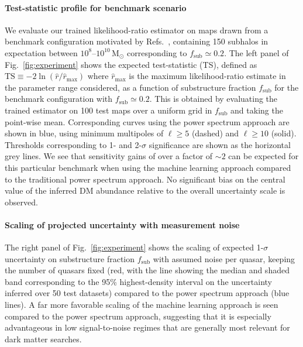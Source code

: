 \documentclass[preprint]{article}
\begin{document}
\paragraph{Test-statistic profile for benchmark scenario} We evaluate our trained likelihood-ratio estimator on maps drawn from a benchmark configuration motivated by Refs.~\cite{Hutten:2016jko,Springel:2008cc}, containing 150 subhalos in expectation between $10^{8}$--$10^{10}\,\mathrm{M}_\odot$ corresponding to $f_\mathrm{sub} \simeq 0.2$. The left panel of Fig.~\ref{fig:experiment} shows the expected test-statistic (TS), defined as $\mathrm{TS} \equiv -2\ln(\hat r / \hat r_\mathrm{max})$ where $\hat r_\mathrm{max}$ is the maximum likelihood-ratio estimate in the parameter range considered, as a function of substructure fraction $f_\mathrm{sub}$ for the benchmark configuration with $f_\mathrm{sub} \simeq 0.2$. This is obtained by evaluating the trained estimator on 100 test maps over a uniform grid in $f_\mathrm{sub}$ and taking the point-wise mean. Corresponding curves using the power spectrum approach are shown in blue, using minimum multipoles of $\ell \geq 5$ (dashed) and $\ell \geq 10$ (solid). Thresholds corresponding to 1- and 2-$\sigma$ significance are shown as the horizontal grey lines. We see that sensitivity gains of over a factor of $\sim 2$ can be expected for this particular benchmark when using the machine learning approach compared to the traditional power spectrum approach. No significant bias on the central value of the inferred DM abundance relative to the overall uncertainty scale is observed.

\paragraph{Scaling of projected uncertainty with measurement noise} The right panel of Fig.~\ref{fig:experiment} shows the scaling of expected 1-$\sigma$ uncertainty on substructure fraction $f_\mathrm{sub}$ with assumed noise per quasar, keeping the number of quasars fixed (red, with the line showing the median and shaded band corresponding to the 95\% highest-density interval on the uncertainty inferred over 50 test datasets) compared to the power spectrum approach (blue lines). A far more favorable scaling of the machine learning approach is seen compared to the power spectrum approach, suggesting that it is especially advantageous in low signal-to-noise regimes that are generally most relevant for dark matter searches.
\end{document}
